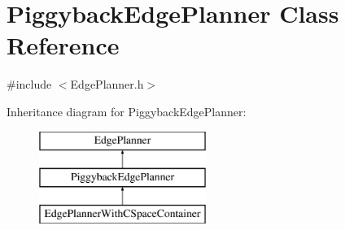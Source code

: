 \section{Piggyback\+Edge\+Planner Class Reference}
\label{classPiggybackEdgePlanner}


{\ttfamily \#include $<$Edge\+Planner.\+h$>$}

Inheritance diagram for Piggyback\+Edge\+Planner\+:\begin{figure}[H]
\begin{center}
\leavevmode
\includegraphics[height=3.000000cm]{classPiggybackEdgePlanner}
\end{center}
\end{figure}
